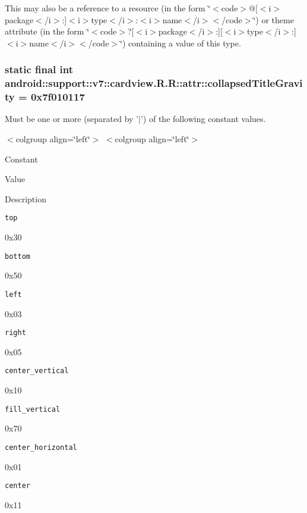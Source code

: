 This may also be a reference to a resource (in the form \char`\"{}$<$code$>$@\mbox{[}$<$i$>$package$<$/i$>$:\mbox{]}$<$i$>$type$<$/i$>$:$<$i$>$name$<$/i$>$$<$/code$>$\char`\"{}) or theme attribute (in the form \char`\"{}$<$code$>$?\mbox{[}$<$i$>$package$<$/i$>$:\mbox{]}\mbox{[}$<$i$>$type$<$/i$>$:\mbox{]}$<$i$>$name$<$/i$>$$<$/code$>$\char`\"{}) containing a value of this type. \hypertarget{classandroid_1_1support_1_1v7_1_1cardview_1_1_r_1_1attr_5236503c38abc0fd69cd9c9be77f5a3d}{
\subsubsection[{collapsedTitleGravity}]{\setlength{\rightskip}{0pt plus 5cm}static final int android::support::v7::cardview.R.R::attr::collapsedTitleGravity = 0x7f010117}}
\label{classandroid_1_1support_1_1v7_1_1cardview_1_1_r_1_1attr_5236503c38abc0fd69cd9c9be77f5a3d}


Must be one or more (separated by '$|$') of the following constant values. \begin{TabularC}{0}
\hline
\end{TabularC}
$<$colgroup align=\char`\"{}left\char`\"{}$>$ $<$colgroup align=\char`\"{}left\char`\"{}$>$ 

Constant

Value

Description 

{\tt top}

0x30

{\tt bottom}

0x50

{\tt left}

0x03

{\tt right}

0x05

{\tt center\_\-vertical}

0x10

{\tt fill\_\-vertical}

0x70

{\tt center\_\-horizontal}

0x01

{\tt center}

0x11

